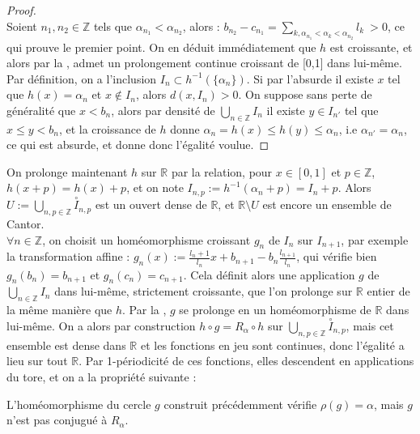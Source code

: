 \documentclass[11pt,a4paper]{article}
\begin{document}
\begin{proof} \\
Soient $n_1,n_2 \in \mathbb{Z}$ tels que $\alpha_{n_1} < \alpha_{n_2}$, alors : $b_{n_2} - c_{n_1} = \displaystyle \sum_{k, \alpha_{n_1} < \alpha_k < \alpha_{n_2}} l_k \  > 0$, ce qui prouve le premier point. On en déduit immédiatement que $h$ est croissante, et alors par la , admet un prolongement continue croissant de [0,1] dans lui-même. \\
 Par définition, on a l'inclusion $I_n \subset h^{-1}(\{\alpha_n\})$. Si par l'absurde il existe $x$ tel que $h(x)=\alpha_n$ et $x \notin I_n$, alors $d(x,I_n) >0$. On suppose sans perte de généralité que $x<b_n$, alors par densité de $\displaystyle \bigcup_{n\in \mathbb{Z}} I_n$ il existe $y\in I_{n'}$ tel que $x\leq y < b_n$, et la croissance de $h$ donne $\alpha_n = h(x) \leq h(y) \leq \alpha_n$, i.e $\alpha_{n'} = \alpha_n$, ce qui est absurde, et donne donc l'égalité voulue. 
\end{proof}

On prolonge maintenant $h$ sur $\mathbb{R}$ par la relation, pour $x\in [0,1]$ et $p\in \mathbb{Z}$, $h(x+p)=h(x)+p$, et on note $I_{n,p}:=h^{-1}(\alpha_n+p)=I_n + p$. Alors $\displaystyle U:= \bigcup_{n,p \in \mathbb{Z}} \overset{\circ}I_{n,p}$ est un ouvert dense de $\mathbb{R}$, et $\mathbb{R}\setminus U$ est encore un ensemble de Cantor. \\

$\forall n \in \mathbb{Z}$, on choisit un homéomorphisme croissant $g_n$ de $I_n$ sur $I_{n+1}$, par exemple la transformation affine : $g_n(x) := \displaystyle \frac{l_n+1}{l_n}x + b_{n+1}-b_n\frac{l_{n+1}}{l_n}$, qui vérifie bien $g_n(b_n)=b_{n+1}$ et $g_n(c_n)=c_{n+1}$. Cela définit alors une application $g$ de $\displaystyle \bigcup_{n\in \mathbb{Z}} I_n$ dans lui-même, strictement croissante, que l'on prolonge sur $\mathbb{R}$ entier de la même manière que $h$. Par la , $g$ se prolonge en un homéomorphisme de $\mathbb{R}$ dans lui-même. On a alors par construction $h \circ g = R_\alpha \circ h$ sur $\displaystyle \bigcup_{n,p \in \mathbb{Z}} \overset{\circ}I_{n,p}$, mais cet ensemble est dense dans $\mathbb{R}$ et les fonctions en jeu sont continues, donc l'égalité a lieu sur tout $\mathbb{R}$. Par 1-périodicité de ces fonctions, elles descendent en applications du tore, et on a la propriété suivante :

\begin{thm}\label{cont}
L'homéomorphisme du cercle $g$ construit précédemment vérifie $\rho(g)=\alpha$, mais $g$ n'est pas conjugué à $R_\alpha$.
\end{thm}
\end{document}
